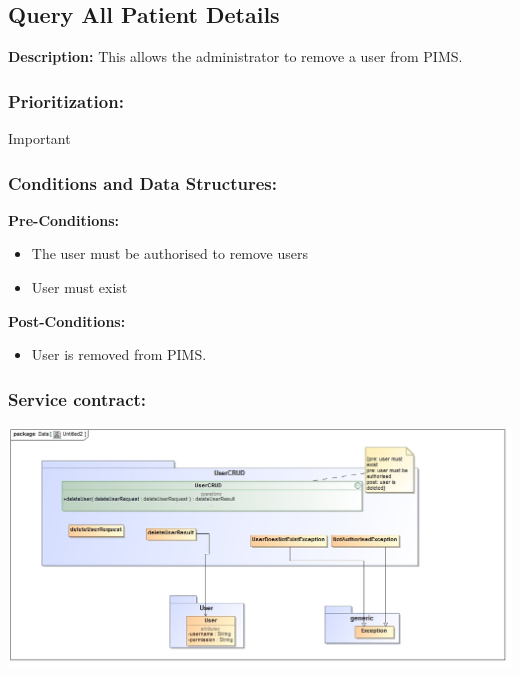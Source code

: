 \subsection{Query All Patient Details}
\textbf{Description:}
This allows the administrator to remove a user from PIMS.
\subsubsection{Prioritization:}
Important
\subsubsection{Conditions and Data Structures:}
\textbf{Pre-Conditions:}
	\begin{itemize}
	\item The user must be authorised to remove users
	\item User must exist
	\end{itemize}
\textbf{Post-Conditions:}
	\begin{itemize}
	\item User is removed from PIMS.
	\end{itemize}	
\subsubsection{Service contract:}
\includegraphics[width=1\linewidth]{./Graphics/6.jpg}
